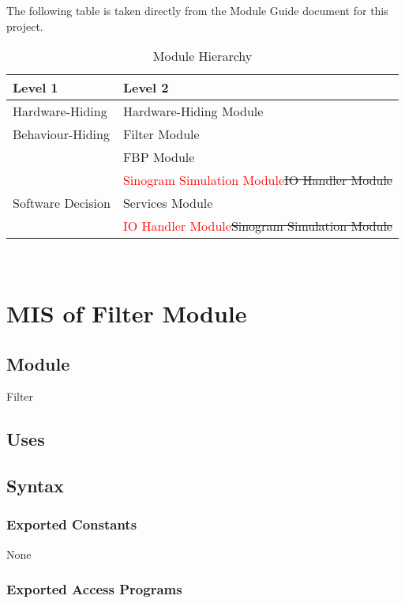 \documentclass[12pt, titlepage]{article}
\newcommand{\add}{\textcolor{red}}
\begin{document}
The following table is taken directly from the Module Guide document for this project.

\begin{table}[h!]
\centering
\begin{tabular}{p{} p{}}
\toprule
\textbf{Level 1} & \textbf{Level 2}\\
\midrule

{Hardware-Hiding} & Hardware-Hiding Module \\
\midrule

{Behaviour-Hiding}
& Filter Module\\
& FBP Module\\
& \add{Sinogram Simulation Module}\st{IO Handler Module}\\
\midrule

{Software Decision} & Services Module\\
& \add{IO Handler Module}\st{Sinogram Simulation Module}\\
\bottomrule

\end{tabular}
\caption{Module Hierarchy}
\label{TblMH}
\end{table}

\newpage
~\newpage

\section{MIS of Filter Module} \label{ModuleF}

\subsection{Module}
Filter

\subsection{Uses}

\subsection{Syntax}

\subsubsection{Exported Constants}
None

\subsubsection{Exported Access Programs}
\end{document}
